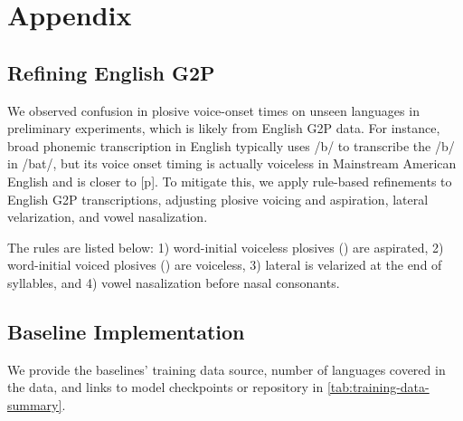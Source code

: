 \section{Appendix}

\subsection{Refining English G2P}
\label{sec:appendix-engg2p}
We observed confusion in plosive voice-onset times on unseen languages in preliminary experiments, which is likely from English G2P data. For instance, broad phonemic transcription in English typically uses /b/ to transcribe the /b/ in /bat/, but its voice onset timing is actually voiceless in Mainstream American English and is closer to [p]. To mitigate this, we apply rule-based refinements to English G2P transcriptions, adjusting plosive voicing and aspiration, lateral velarization, and vowel nasalization.

The rules are listed below: 
1) word-initial voiceless plosives () are aspirated,
2) word-initial voiced plosives () are voiceless, 
3) lateral  is velarized at the end of syllables, and 
4) vowel nasalization before nasal consonants.


\subsection{Baseline Implementation}
\label{sec:appendix-baseline}
We provide the baselines' training data source, number of languages covered in the data, and links to model checkpoints or repository in \autoref{tab:training-data-summary}.

